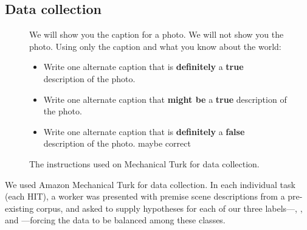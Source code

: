 

\subsection{Data collection}

\begin{figure}
\begin{framed}
\small
We will show you the caption for a photo. We will not show you the photo. Using only the caption and what you know about the world:
\begin{itemize}
\item Write one alternate caption that is \textbf{definitely} a \textbf{true} description of the photo. 
\item Write one alternate caption that \textbf{might be} a \textbf{true} description of the photo. 
\item Write one alternate caption that is \textbf{definitely} a \textbf{false} description of the photo.  maybe correct 
\end{itemize}
\end{framed}

\caption{\label{instructions-1}The instructions used on Mechanical Turk for data collection.}
\end{figure}

We used Amazon Mechanical Turk for data collection. In each individual task (each HIT), a worker was presented with premise scene descriptions from a pre-existing corpus, and asked to supply hypotheses for each of our three labels---, , and ---forcing the data to be balanced among these classes.

